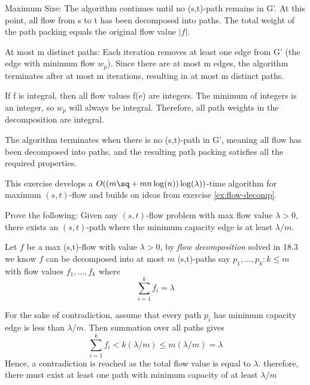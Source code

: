 \documentclass{article}
\begin{document}
\begin{solution}
\begin{subproof}[Correctness]
Maximum Size: The algorithm continues until no (s,t)-path remains in G'. At this point, all flow from s to t has been decomposed into paths. The total weight of the path packing equals the original flow value $|f|$.

At most m distinct paths: Each iteration removes at least one edge from G' (the edge with minimum flow $w_p$). Since there are at most m edges, the algorithm terminates after at most m iterations, resulting in at most m distinct paths.

If f is integral, then all flow values f(e) are integers. The minimum of integers is an integer, so $w_p$ will always be integral. Therefore, all path weights in the decomposition are integral.

The algorithm terminates when there is no (s,t)-path in G', meaning all flow has been decomposed into paths, and the resulting path packing satisfies all the required properties.
\end{subproof}
\end{solution}
\pagebreak

 This exercise develops a \( O((m\sq + mn\log(n))\log(\lambda)) \)-time algorithm for maximum \( (s,t) \)-flow and builds on ideas from exercise \ref{ex:flow-decomp}.

\begin{subexercise} \label{ex:proof-lambda}
Prove the following: Given any \( (s, t) \)-flow problem with max flow value \( \lambda > 0 \), there exists an \( (s, t) \)-path where the minimum capacity edge is at least \( \lambda/m \).
\end{subexercise}

\begin{solution}
Let $f$ be a max (s,t)-flow with value $\lambda > 0$, by \textit{flow decomposition} solved in 18.3  we know $f$ can be decomposed into at most $m$ (s,t)-paths say $p_1, \dots, p_k : k\leq m$ with flow values $f_1,\dots,f_k$ where \[\sum_{i=1}^k f_i = \lambda\]

For the sake of contradiction, assume that every path $p_i$ has minimum capacity edge is less than $\lambda/m$. Then summation over all paths gives \[ \sum_{i=1}^k f_i < k(\lambda/m) \leq m(\lambda/m) = \lambda\]
Hence, a contradiction is reached as the total flow value is equal to $\lambda$. therefore, there must exist at least one path with minimum capacity of at least $\lambda/m$

\end{solution}
\pagebreak
\end{document}
